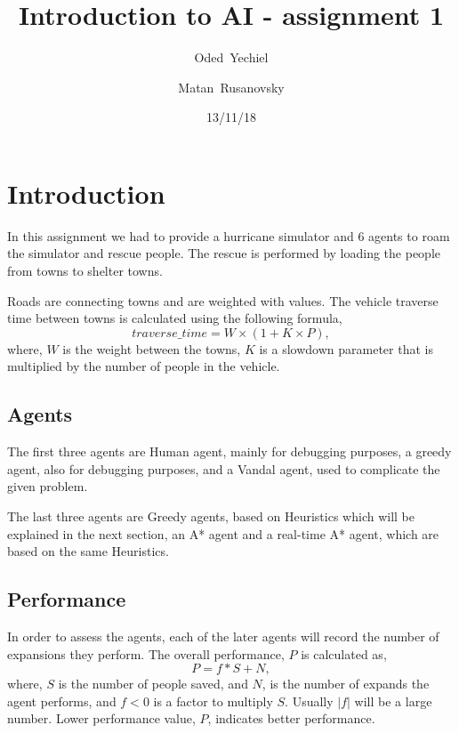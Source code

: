 \documentclass{article}                     %
\begin{document}
	
\title{Introduction to AI - assignment 1}


\author{Oded~Yechiel         \and
	Matan~Rusanovsky
}

\date{13/11/18}

\maketitle

\section{Introduction}
	In this assignment we had to provide a hurricane simulator and 6 agents to roam the simulator and rescue people. The rescue is performed by loading the people from towns to shelter towns.
	
	Roads are connecting towns and are weighted with values. The vehicle traverse time between towns is calculated using the following formula, 
	\begin{equation}\label{eq:traverse_time}
	traverse\_time = W \times (1 + K \times P), 
	\end{equation}
	where, $ W $ is the weight between the towns, $ K $ is a slowdown parameter that is multiplied by the number of people in the vehicle.
	
	\subsection{Agents}
	The first three agents are Human agent, mainly for debugging purposes, a greedy agent, also for debugging purposes, and a Vandal agent, used to complicate the given problem.
	
	The last three agents are Greedy agents, based on Heuristics which will be explained in the next section, an A* agent and a real-time A* agent, which are based on the same Heuristics.

	\subsection{Performance}
	In order to assess the agents, each of the later agents will record the number of expansions they perform. 
	The overall performance, $ P $ is calculated as,
	\begin{equation}\label{eq:performance}
	P = f * S + N, 
	\end{equation}
	where, $ S $ is the number of people saved, and $ N $, is the number of expands the agent performs, and $ f < 0 $ is a factor to multiply $ S $. Usually $ | f | $ will be a large number.
	Lower performance value, $ P $, indicates better performance.
	\\
	\\
	
\end{document}
